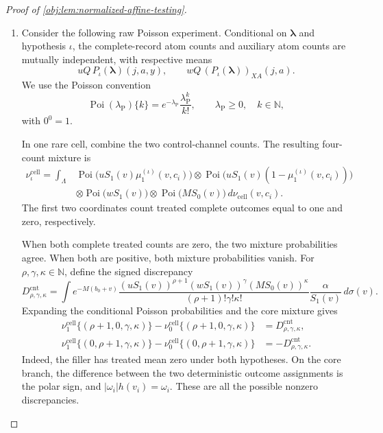 \begin{proof}[Proof of \cref{obj:lem:normalized-affine-testing}]
\begin{enumerate}
\item
Consider the following raw Poisson experiment. Conditional on
\(\boldsymbol\lambda\) and hypothesis \(\iota\), the complete-record atom counts and auxiliary atom counts are mutually independent, with respective means
\[
uQ\,P_\iota(\boldsymbol\lambda)(j,a,y),
\qquad
wQ\,(P_\iota(\boldsymbol\lambda))_{XA}(j,a).
\]
We use the Poisson convention
\[
\operatorname{Poi}(\lambda_{\mathrm P})\{k\}
=e^{-\lambda_{\mathrm P}}\frac{\lambda_{\mathrm P}^k}{k!},
\qquad \lambda_{\mathrm P}\ge0,\quad k\in\mathbb N,
\]
with \(0^0=1\).

In one rare cell, combine the two control-channel counts. The resulting four-count mixture is
\[
\begin{aligned}
\nu_\iota^{\mathrm{cell}}
=\int_{\Lambda}
&\operatorname{Poi}\bigl(uS_1(v)\mu_1^{(\iota)}(v,c_i)\bigr)
\otimes
\operatorname{Poi}\bigl(uS_1(v)(1-\mu_1^{(\iota)}(v,c_i))\bigr)\\
&\otimes\operatorname{Poi}\bigl(wS_1(v)\bigr)
\otimes\operatorname{Poi}\bigl(MS_0(v)\bigr)
\,d\nu_{\mathrm{cell}}(v,c_i).
\end{aligned}
\]
The first two coordinates count treated complete outcomes equal to one and zero, respectively.

When both complete treated counts are zero, the two mixture probabilities agree. When both are positive, both mixture probabilities vanish. For
\(\rho,\gamma,\kappa\in\mathbb N\), define the signed discrepancy
\[
D_{\rho,\gamma,\kappa}^{\mathrm{cnt}}
=
\int e^{-M(b_0+v)}
\frac{(uS_1(v))^{\rho+1}(wS_1(v))^\gamma(MS_0(v))^\kappa}
     {(\rho+1)!\gamma!\kappa!}
\frac{\alpha}{S_1(v)}\,d\sigma(v).
\]
Expanding the conditional Poisson probabilities and the core mixture gives
\[
\begin{aligned}
\nu_1^{\mathrm{cell}}\{(\rho+1,0,\gamma,\kappa)\}
-\nu_0^{\mathrm{cell}}\{(\rho+1,0,\gamma,\kappa)\}
&=D_{\rho,\gamma,\kappa}^{\mathrm{cnt}},\\
\nu_1^{\mathrm{cell}}\{(0,\rho+1,\gamma,\kappa)\}
-\nu_0^{\mathrm{cell}}\{(0,\rho+1,\gamma,\kappa)\}
&=-D_{\rho,\gamma,\kappa}^{\mathrm{cnt}}.
\end{aligned}
\]
Indeed, the filler has treated mean zero under both hypotheses. On the core branch, the difference between the two deterministic outcome assignments is the polar sign, and
\(|\omega_i|h(v_i)=\omega_i\). These are all the possible nonzero discrepancies.


\end{enumerate}
\end{proof}
